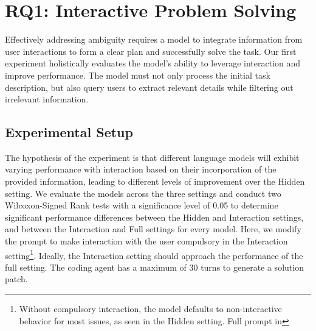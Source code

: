 \section{RQ1: Interactive Problem Solving}
\label{sec:ProblemSolving}

Effectively addressing ambiguity requires a model to integrate information from user interactions to form a clear plan and successfully solve the task. Our first experiment holistically evaluates the model’s ability to leverage interaction and improve performance. The model must not only process the initial task description, but also query users to extract relevant details while filtering out irrelevant information. 

\subsection{Experimental Setup}
The hypothesis of the experiment is that different language models will exhibit varying performance with interaction based on their incorporation of the provided information, leading to different levels of improvement over the Hidden setting. We evaluate the models across the three settings and conduct two Wilcoxon-Signed Rank tests with a significance level of 0.05 to determine significant performance differences between the Hidden and Interaction settings, and between the Interaction and Full settings for every model. Here, we modify the prompt to make interaction with the user compulsory in the Interaction setting\footnote{Without compulsory interaction, the model defaults to non-interactive behavior for most issues, as seen in the Hidden setting. Full prompt in }. Ideally, the Interaction setting should approach the performance of the full setting. The coding agent has a maximum of 30 turns to generate a solution patch.

